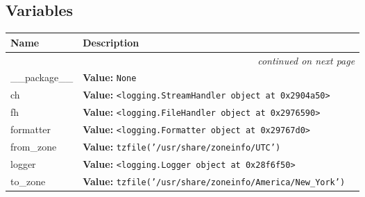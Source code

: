 
  \subsection{Variables}

    \vspace{-1cm}
\hspace{\varindent}\begin{longtable}{|p{\varnamewidth}|p{\vardescrwidth}|l}
\cline{1-2}
\cline{1-2} \centering \textbf{Name} & \centering \textbf{Description}& \\
\cline{1-2}
\endhead\cline{1-2}\multicolumn{3}{r}{\small\textit{continued on next page}}\\\endfoot\cline{1-2}
\endlastfoot\raggedright \_\-\_\-p\-a\-c\-k\-a\-g\-e\-\_\-\_\- & \raggedright \textbf{Value:} 
{\tt None}&\\
\cline{1-2}
\raggedright c\-h\- & \raggedright \textbf{Value:} 
{\tt {\textless}logging.StreamHandler object at 0x2904a50{\textgreater}}&\\
\cline{1-2}
\raggedright f\-h\- & \raggedright \textbf{Value:} 
{\tt {\textless}logging.FileHandler object at 0x2976590{\textgreater}}&\\
\cline{1-2}
\raggedright f\-o\-r\-m\-a\-t\-t\-e\-r\- & \raggedright \textbf{Value:} 
{\tt {\textless}logging.Formatter object at 0x29767d0{\textgreater}}&\\
\cline{1-2}
\raggedright f\-r\-o\-m\-\_\-z\-o\-n\-e\- & \raggedright \textbf{Value:} 
{\tt tzfile('/usr/share/zoneinfo/UTC')}&\\
\cline{1-2}
\raggedright l\-o\-g\-g\-e\-r\- & \raggedright \textbf{Value:} 
{\tt {\textless}logging.Logger object at 0x28f6f50{\textgreater}}&\\
\cline{1-2}
\raggedright t\-o\-\_\-z\-o\-n\-e\- & \raggedright \textbf{Value:} 
{\tt tzfile('/usr/share/zoneinfo/America/New\_York')}&\\
\cline{1-2}
\end{longtable}



